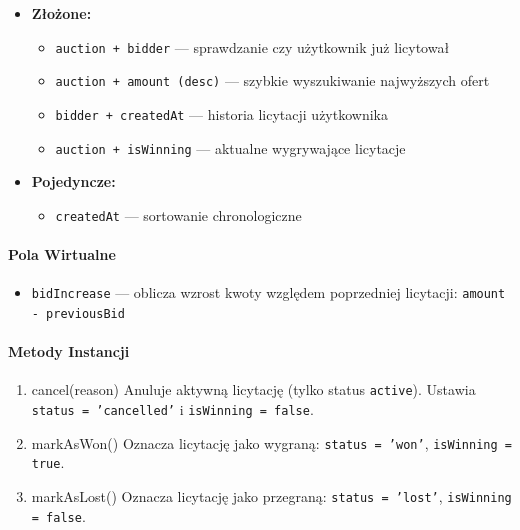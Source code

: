 \begin{itemize}
  \item \textbf{Złożone:}
        \begin{itemize}
          \item \texttt{auction + bidder} --- sprawdzanie czy użytkownik już licytował
          \item \texttt{auction + amount (desc)} --- szybkie wyszukiwanie najwyższych ofert
          \item \texttt{bidder + createdAt} --- historia licytacji użytkownika
          \item \texttt{auction + isWinning} --- aktualne wygrywające licytacje
        \end{itemize}
  \item \textbf{Pojedyncze:}
        \begin{itemize}
          \item \texttt{createdAt} --- sortowanie chronologiczne
        \end{itemize}
\end{itemize}

\paragraph{Pola Wirtualne}

\begin{itemize}
  \item \texttt{bidIncrease} --- oblicza wzrost kwoty względem poprzedniej licytacji: \texttt{amount - previousBid}
\end{itemize}

\paragraph{Metody Instancji}

\begin{enumerate}
  \item cancel(reason)
        Anuluje aktywną licytację (tylko status \texttt{active}). Ustawia \texttt{status = 'cancelled'} i \texttt{isWinning = false}.

  \item markAsWon()
        Oznacza licytację jako wygraną: \texttt{status = 'won'}, \texttt{isWinning = true}.

  \item markAsLost()
        Oznacza licytację jako przegraną: \texttt{status = 'lost'}, \texttt{isWinning = false}.
\end{enumerate}

